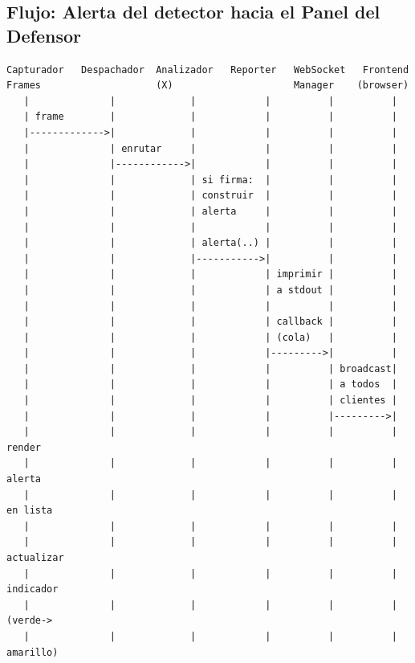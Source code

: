 \documentclass[11pt,a4paper]{article}
\begin{document}
\subsection{Flujo: Alerta del detector hacia el Panel del Defensor}

\vspace{0.3cm}
\begin{verbatim}
Capturador   Despachador  Analizador   Reporter   WebSocket   Frontend
Frames                    (X)                     Manager    (browser)
   |              |             |            |          |          |
   | frame        |             |            |          |          |
   |------------->|             |            |          |          |
   |              | enrutar     |            |          |          |
   |              |------------>|            |          |          |
   |              |             | si firma:  |          |          |
   |              |             | construir  |          |          |
   |              |             | alerta     |          |          |
   |              |             |            |          |          |
   |              |             | alerta(..) |          |          |
   |              |             |----------->|          |          |
   |              |             |            | imprimir |          |
   |              |             |            | a stdout |          |
   |              |             |            |          |          |
   |              |             |            | callback |          |
   |              |             |            | (cola)   |          |
   |              |             |            |--------->|          |
   |              |             |            |          | broadcast|
   |              |             |            |          | a todos  |
   |              |             |            |          | clientes |
   |              |             |            |          |--------->|
   |              |             |            |          |          | render
   |              |             |            |          |          | alerta
   |              |             |            |          |          | en lista
   |              |             |            |          |          |
   |              |             |            |          |          | actualizar
   |              |             |            |          |          | indicador
   |              |             |            |          |          | (verde->
   |              |             |            |          |          |  amarillo)
\end{verbatim}
\end{document}
